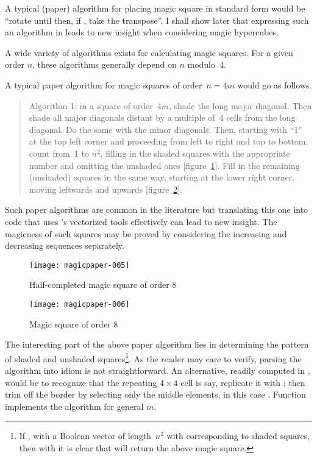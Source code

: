 \documentclass[nojss]{jss}
\begin{document}
A typical (paper) algorithm for placing magic square  in
standard form would be ``rotate  until
 then, if ,
take the transpose''.  I shall show later that expressing such an
algorithm in  leads to new insight when considering magic
hypercubes.

A wide variety of algorithms exists for calculating magic squares.
For a given order $n$, these algorithms generally depend on $n$
modulo~4.

A typical paper algorithm for magic squares of order~$n=4m$ would go as
follows.
\begin{quote}
Algorithm 1:
in a square of order~$4m$, shade the long major diagonal.  Then shade
all major diagonals distant by a multiple of~4 cells from the long
diagonal.  Do the same with the minor diagonals.  Then, starting with
``1'' at the top left corner and proceeding from left to right and top
to bottom, count from~1 to $n^2$, filling in the shaded squares
with the appropriate number and omitting  the unshaded ones
[figure~\ref{magicsquare8.halfdone}].  Fill in the remaining
(unshaded) squares in the same way, starting at the lower right
corner, moving leftwards and upwards [figure~\ref{magicsquare8}].
\end{quote}

Such paper algorithms are common in the literature but translating
this one into code that uses 's vectorized tools effectively can
lead to new insight.  The magicness of such squares may be proved by
considering the increasing and decreasing sequences separately.

\begin{figure}[htb]
  \begin{center}
\texttt{[image: magicpaper-005]}
    \caption{Half-completed magic square of
        order\label{magicsquare8.halfdone} 8}
  \end{center}
\end{figure}

\begin{figure}[htb]
  \begin{center}
\texttt{[image: magicpaper-006]}
    \caption{Magic square of order\label{magicsquare8} 8}
  \end{center}
\end{figure}

The interesting part of the above paper algorithm lies in determining
the pattern of shaded and unshaded squares\footnote{If , with  a Boolean vector of length~$n^2$
with  corresponding to shaded squares, then with it is
clear that  will return the above magic
square.}.  As the reader may care to verify, parsing the algorithm
into  idiom is not straightforward.  An alternative, readily
computed in , would be to recognize that the repeating $4\times 4$
cell  is 
say, replicate it with ; then
trim off the border by selecting only the middle elements, in this
case .  Function  implements the
algorithm for general $m$.
\end{document}
